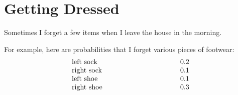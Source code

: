 \documentclass[12pt]{article}
\begin{document}

\newpage

\section{Getting Dressed}
Sometimes I forget a few items when I leave the house in the morning.

 For example, here are probabilities that I forget various
pieces of footwear:
%
\[
\begin{array}{p{2in}l}
left sock & 0.2 \\
right sock & 0.1 \\
left shoe & 0.1 \\
right shoe & 0.3
\end{array}
\]
%
\end{document}

